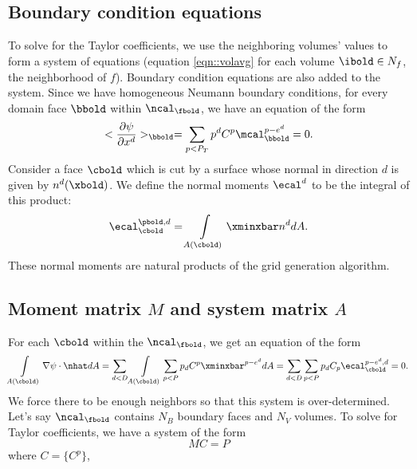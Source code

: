 \documentclass{article}
\begin{document}
{\subsection{Boundary condition equations}

To solve for the Taylor coefficients, we use the neighboring volumes'
values  to form a system of equations (equation \ref{eqn::volavg}
for each volume $\ibold \in N_f$, the neighborhood of $f$).  Boundary
condition equations are also added to the system.   Since we have
homogeneous Neumann boundary conditions, for every domain face $\bbold$
within $\ncal_\fbold$, we have an equation of the form
\begin{equation}
  <\frac{\partial \psi}{\partial x^d}>_\bbold  =
  \sum\limits_{p < P_T} p^d C^{p} \mcal^{p-e^d}_\bbold = 0.
\end{equation}
Consider a face $\cbold$ which is cut by a surface whose
normal in direction $d$ is given by $n^d(\xbold)$.  We define the
normal moments $\ecal^d$ to be the integral of this product:
\begin{equation}
\ecal^{\pbold, d}_\cbold  =  \int\limits_{A(\cbold)} \xminxbar n^d dA.
\label{eqn::normmoment}
\end{equation}
These normal moments are natural products of the \cite{Schwartz2015}
grid generation algorithm.

\subsection{Moment matrix $M$ and system matrix $A$}

For each $\cbold$ within the $\ncal_\fbold$, we get an equation of the form
\begin{equation}
  \int\limits_{A(\cbold)}  \nabla \psi \cdot \nhat dA =
  \sum\limits_{d < D} \int\limits_{A(\cbold)} \sum_{p < P} p_d C^p
  \xminxbar^{p-e^d} dA
  = 
\sum\limits_{d < D} \sum_{p < P}  p_d C_p \ecal^{p-e^d,d}_\cbold = 0.
\end{equation}
We force there to be enough neighbors so that this system is
over-determined.  Let's say $\ncal_\fbold$ contains $N_B$ boundary faces and
$N_V$ volumes.   To solve for Taylor coefficients, we have a system 
of the form
\begin{equation*}
M C = P 
\end{equation*}
where $C=\{C^p\}$, 

}
\end{document}
